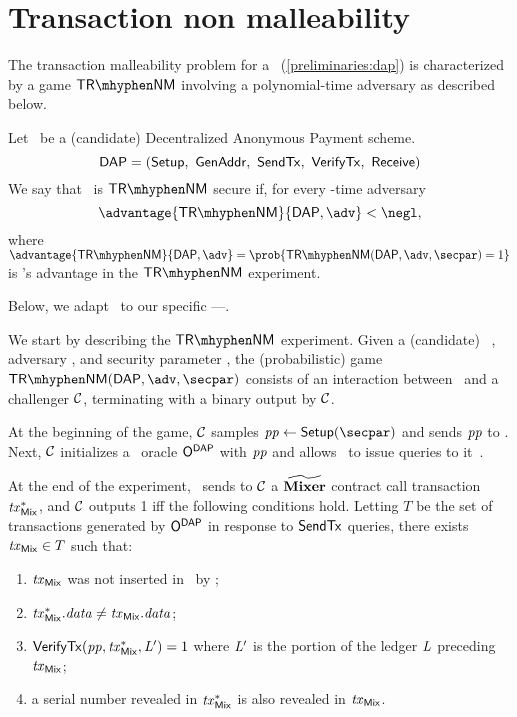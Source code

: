 

\chapter{Transaction non malleability}\label{appendix:trnm}

The transaction malleability problem for a \dapscheme~(\cref{preliminaries:dap}) is characterized by a game $\trnm$ involving a polynomial-time adversary \adv{} as described below.

\begin{definition}
Let \dapscheme~be a (candidate) Decentralized Anonymous Payment scheme.
\[
  \dapscheme = (\setup,\ \genadd,\ \sendtx,\ \verifytx,\ \receive)
\]
We say that \dapscheme~is $\trnm$ secure if, for every \poly-time adversary \adv~
\[
    \advantage{\trnm}{\dapscheme, \adv} < \negl,
\]
where $\advantage{\trnm}{\dapscheme ,\adv} = \prob{\trnm(\dapscheme, \adv, \secpar) = 1}$ is \adv’s advantage in the $\trnm$ experiment.
\end{definition}

Below, we adapt~\cite[Appendix C.2]{sasson2014zerocash} to our specific \dapscheme---\zeth.

We start by describing the $\trnm$ experiment.
Given a (candidate) \zeth~\dapscheme, adversary \adv, and security parameter \secpar, the (probabilistic) game $\trnm(\dapscheme, \adv, \secpar)$ consists of an interaction between \adv~and a challenger $\mathcal{C}$, terminating with a binary output by $\mathcal{C}$.

At the beginning of the game, $\mathcal{C}$ samples $\pparams \gets \setup(\secpar)$ and sends $\mathit{pp}$ to \adv. Next, $\mathcal{C}$ initializes a \dapscheme~oracle $\mathsf{O}^{\mathsf{DAP}}$ with $\mathit{pp}$ and allows \adv~to issue queries to it~\cite[Appendix B]{zethpaper}.

At the end of the experiment, \adv~sends to $\mathcal{C}$ a $\widetilde{\mathbf{Mixer}}$ contract call transaction $\mathit{tx}^*_{\mathsf{Mix}}$, and $\mathcal{C}$ outputs 1 iff the following conditions hold. Letting $T$ be the set of transactions generated by $\mathsf{O}^{\mathsf{DAP}}$ in response to $\mathsf{SendTx}$ queries, there exists $\mathit{tx}_{\mathsf{Mix}} \in T$ such that:
\begin{enumerate}
    \item $\mathit{tx}_{\mathsf{Mix}}$ was not inserted in \ledger~by \adv;
    \item $\mathit{tx}^*_{\mathsf{Mix}}.\mathit{data} \neq \mathit{tx}_{\mathsf{Mix}}.\mathit{data}$;
    \item $\mathsf{VerifyTx}(\mathit{pp}, \mathit{tx}^*_{\mathsf{Mix}}, \mathit{L}') = 1$ where $\mathit{L}'$ is the portion of the ledger $\mathit{L}$ preceding $\mathit{tx}_{\mathsf{Mix}}$;
    \item a serial number revealed in $\mathit{tx}^*_{\mathsf{Mix}}$ is also revealed in $\mathit{tx}_{\mathsf{Mix}}$.
\end{enumerate}

